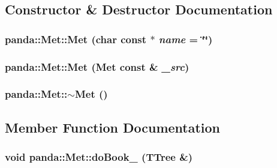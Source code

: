 \subsection{Constructor \& Destructor Documentation}
\hypertarget{classpanda_1_1Met_a7bddafddf79440a1e31a1a18ed7d59c5}{
\subsubsection[{Met}]{\setlength{\rightskip}{0pt plus 5cm}panda::Met::Met (char const $\ast$ {\em name} = {\ttfamily \char`\"{}\char`\"{}})}}
\label{classpanda_1_1Met_a7bddafddf79440a1e31a1a18ed7d59c5}
\hypertarget{classpanda_1_1Met_ab48ed0a53644d320f210437b009043b5}{
\subsubsection[{Met}]{\setlength{\rightskip}{0pt plus 5cm}panda::Met::Met ({\bf Met} const \& {\em \_\-src})}}
\label{classpanda_1_1Met_ab48ed0a53644d320f210437b009043b5}
\hypertarget{classpanda_1_1Met_aa8776da8d9be6dc0ff1e37ee54ddc69f}{
\subsubsection[{$\sim$Met}]{\setlength{\rightskip}{0pt plus 5cm}panda::Met::$\sim$Met ()}}
\label{classpanda_1_1Met_aa8776da8d9be6dc0ff1e37ee54ddc69f}


\subsection{Member Function Documentation}
\hypertarget{classpanda_1_1Met_a83b50dafc33d3e97271e54ad1709e16e}{
\subsubsection[{doBook\_\-}]{\setlength{\rightskip}{0pt plus 5cm}void panda::Met::doBook\_\- (TTree \&)}}
\label{classpanda_1_1Met_a83b50dafc33d3e97271e54ad1709e16e}


